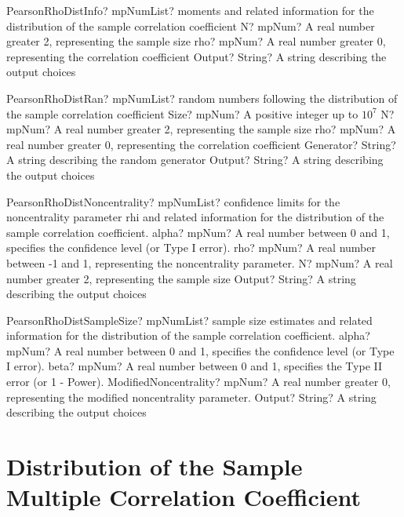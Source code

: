\documentclass[12pt,a4paper,openany]{book}
\begin{document}
\begin{mpFunctionsExtract}
\mpFunctionThreeNotImplemented
{PearsonRhoDistInfo? mpNumList? moments and related information for the distribution of the sample correlation coefficient}
{N? mpNum? A real number greater 2, representing the sample size}
{rho? mpNum? A real number greater 0, representing the correlation coefficient}
{Output? String? A string describing the output choices}
\end{mpFunctionsExtract}

\begin{mpFunctionsExtract}
\mpFunctionFiveNotImplemented
{PearsonRhoDistRan? mpNumList? random numbers following the distribution of the sample correlation coefficient}
{Size? mpNum? A positive integer up to $10^7$}
{N? mpNum? A real number greater 2, representing the sample size}
{rho? mpNum? A real number greater 0, representing the correlation coefficient}
{Generator? String? A string describing the random generator}
{Output? String? A string describing the output choices}
\end{mpFunctionsExtract}

\begin{mpFunctionsExtract}
\mpFunctionFourNotImplemented
{PearsonRhoDistNoncentrality? mpNumList? confidence limits for the noncentrality parameter rhi and related information for the distribution of the sample correlation coefficient.}
{alpha? mpNum? A real number between 0 and 1, specifies the confidence level (or Type I error).}
{rho? mpNum? A real number between -1 and 1, representing the noncentrality parameter.}
{N? mpNum? A real number greater 2, representing the sample size}
{Output? String? A string describing the output choices}
\end{mpFunctionsExtract}

\begin{mpFunctionsExtract}
\mpFunctionFourNotImplemented
{PearsonRhoDistSampleSize? mpNumList? sample size estimates and related information for the distribution of the sample correlation coefficient.}
{alpha? mpNum? A real number between 0 and 1, specifies the confidence level (or Type I error).}
{beta? mpNum?  A real number between 0 and 1, specifies the Type II error (or 1 - Power).}
{ModifiedNoncentrality? mpNum? A real number greater 0, representing the modified noncentrality parameter.}
{Output? String? A string describing the output choices}
\end{mpFunctionsExtract}

\section{Distribution of the Sample Multiple Correlation Coefficient}
\end{document}

